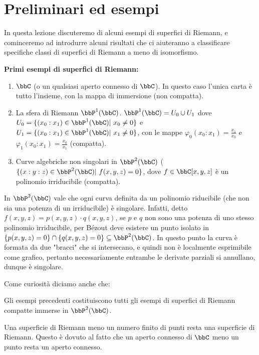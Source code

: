 
\section{Preliminari ed esempi}
In questa lezione discuteremo di alcuni esempi di superfici di Riemann, e cominceremo ad introdurre alcuni risultati che ci aiuteranno a classificare specifiche classi di superfici di Riemann a meno di isomorfismo.

\textbf{Primi esempi di superfici di Riemann:}
\begin{enumerate}
  \item $\bbC$ (o un qualsiasi aperto connesso di $\bbC$). In questo caso l'unica carta è tutto l'insieme, con la mappa di immersione (non compatta).
  \item La sfera di Riemann $\bbP^1(\bbC)$. $\bbP^1(\bbC)=U_0\cup U_1$ dove $U_0=\{(x_0:x_1)\in \bbP^1(\bbC) | \ x_0\neq 0\}$ e $U_1=\{(x_0:x_1)\in \bbP^1(\bbC) | \ x_1\neq 0\}$, con le mappe $\varphi_0(x_0:x_1)=\frac{x_1}{x_0}$ e $\varphi_1(x_0:x_1)=\frac{x_0}{x_1}$ (compatta).
  \item Curve algebriche non singolari in $\bbP^2(\bbC)$ ($\{(x:y:z)\in \bbP^2(\bbC) | \ f(x,y,z)=0\}$, dove $f\in \bbC[x,y,z]$ è un polinomio irriducibile (compatta). %
\end{enumerate}
\begin{osservazione}
    In $\bbP^2(\bbC)$ vale che ogni curva definita da un polinomio riducibile (che non sia una potenza di un irriducibile) è singolare. Infatti, detto $f(x,y,z)=p(x,y,z)\cdot q(x,y,z)$, se $p$ e $q$ non sono una potenza di uno stesso polinomio irriducibile, per Bézout deve esistere un punto isolato in $\{p(x,y,z)=0\}\cap\{q(x,y,z)=0\}\subseteq \bbP^2(\bbC)$. In questo punto la curva è formata da due "bracci" che si intersecano, e quindi non è localmente esprimibile come grafico, pertanto necessariamente entrambe le derivate parziali si annullano, dunque è singolare. %
\end{osservazione}

Come curiosità diciamo anche che:
\begin{divagazione}[di Chow]
    Gli esempi precedenti costituiscono tutti gli esempi di superfici di Riemann compatte immerse in $\bbP^2(\bbC)$.
\end{divagazione}
\begin{osservazione}
    Una superficie di Riemann meno un numero finito di punti resta una superficie di Riemann. Questo è dovuto al fatto che un aperto connesso di $\bbC$ meno un punto resta un aperto connesso.
\end{osservazione}


